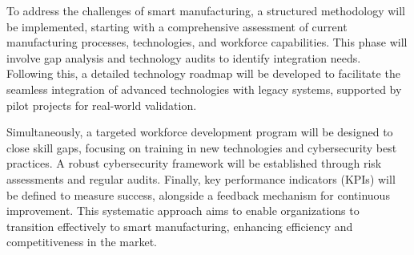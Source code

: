 To address the challenges of smart manufacturing, a structured methodology will be implemented, starting with a comprehensive assessment of current manufacturing processes, technologies, and workforce capabilities. This phase will involve gap analysis and technology audits to identify integration needs. Following this, a detailed technology roadmap will be developed to facilitate the seamless integration of advanced technologies with legacy systems, supported by pilot projects for real-world validation.

Simultaneously, a targeted workforce development program will be designed to close skill gaps, focusing on training in new technologies and cybersecurity best practices. A robust cybersecurity framework will be established through risk assessments and regular audits. Finally, key performance indicators (KPIs) will be defined to measure success, alongside a feedback mechanism for continuous improvement. This systematic approach aims to enable organizations to  transition effectively to smart manufacturing, enhancing efficiency and competitiveness in the market.